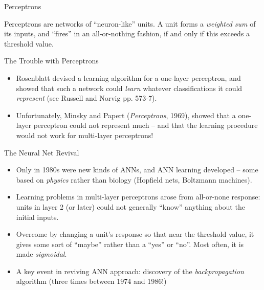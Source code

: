 \documentclass{article}
\begin{document}
\begin{slide}{}
{\Large Perceptrons}

Perceptrons are networks of ``neuron-like'' units. A unit
forms a {\em weighted sum} of its inputs, and ``fires'' in an
all-or-nothing fashion, if and only if this exceeds a threshold
value.
\begin{center}


\end{center}
\end{slide}

\begin{slide}{}
{\Large The Trouble with Perceptrons}
\begin{itemize}
\item Rosenblatt devised a learning algorithm for a one-layer perceptron,
and showed that such a network could {\em learn} whatever
classifications it could {\em represent} (see Russell and Norvig
pp. 573-7). 
\item Unfortunately, Minsky and Papert ({\em Perceptrons}, 1969), showed
that a one-layer perceptron could not represent much -- and that the
learning procedure would not work for multi-layer perceptrons!
\end{itemize}
\begin{center}


\end{center}
\end{slide}

\begin{slide}{}
{\Large The Neural Net Revival}
\begin{itemize}
\item Only in 1980s were new kinds of ANNs, and
ANN learning developed -- some based on {\em physics}
rather than biology (Hopfield nets, Boltzmann machines).
\item Learning problems in multi-layer perceptrons arose
from all-or-none response: units in layer
2 (or later) could not generally ``know'' anything about the initial
inputs.
\item Overcome by changing a unit's response so that near
the threshold value, it gives some sort of ``maybe'' rather than a
``yes'' or ``no''. Most often, it is made {\em sigmoidal}.
\item A key event in reviving ANN approach:
discovery of the {\em backpropagation} algorithm (three times between
1974 and 1986!)
\end{itemize}
\end{slide}
\end{document}
